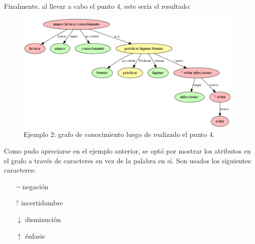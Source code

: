 Finalmente, al llevar a cabo el punto $4$, este sería el resultado:
\begin{figure}[H]
	\begin{center}
		\includegraphics[width=\textwidth]{graphics/knowledge_graph_example2_4.png}
		\caption[Ejemplo 2: grafo de conocimiento luego de realizado el punto 4]{Ejemplo 2: grafo de conocimiento luego de realizado el punto 4.}
		\label{fig:knowledge_graph2.4}
	\end{center}
\end{figure}

Como pudo apreciarse en el ejemplo anterior, se optó por mostrar los atributos en el grafo a través de caracteres en vez de la palabra en sí. Son usados los siguientes caracteres:
\begin{itemize}
	\item[$\lnot$] negación
	\item[?] incertidumbre
	\item[$\downarrow$] disminución
	\item[$\uparrow$] énfasis
\end{itemize}

